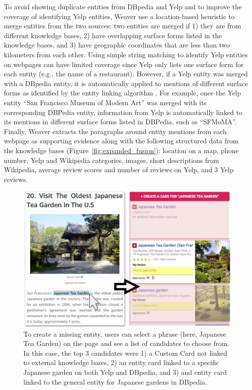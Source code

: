 To avoid showing duplicate entities from DBpedia and Yelp and to improve the coverage of identifying Yelp entities, Weaver use a location-based heuristic to merge entities from the two sources: two entities are merged if 1) they are from different knowledge bases, 2) have overlapping surface forms listed in the knowledge bases, and 3) have geographic coordinates that are less than two kilometers from each other. Using simple string matching to identify Yelp entities on webpages can have limited coverage since Yelp only lists one surface form for each entity (e.g., the name of a restaurant). However, if a Yelp entity was merged with a DBpedia entity, it is automatically applied to mentions of different surface forms as identified by the entity linking algorithm \cite{spotlight}. For example, once the Yelp entity ``San Francisco Museum of Modern Art'' was merged with its corresponding DBPedia entity, information from Yelp is automatically linked to its mentions in different surface forms listed in DBPedia, such as ``SFMoMA''.
Finally, Weaver extracts the paragraphs around entity mentions from each webpage as supporting evidence along with the following structured data from the knowledge bases (Figure~\ref{fig:expanded_fusion}): location on a map, phone number, Yelp and Wikipedia categories, images, short descriptions from Wikipedia, average review scores and number of reviews on Yelp, and 3 Yelp reviews.


\begin{figure}
    \centering
    \includegraphics[width=0.5\columnwidth]{Chapters/Weaver/custom4.png}
    \caption[Creating manual entity cards.]{To create a missing entity, users can select a phrase (here, Japanese Tea Garden) on the page and see a list of candidates to choose from. In this case, the top 3 candidates were 1) a Custom Card not linked to external knowledge bases, 2) an entity card linked to a specific Japanese garden on both Yelp and DBpedia, and 3) and entity card linked to the general entity for Japanese gardens in DBpedia.}
    \label{fig:custom_fusion}
\end{figure}

